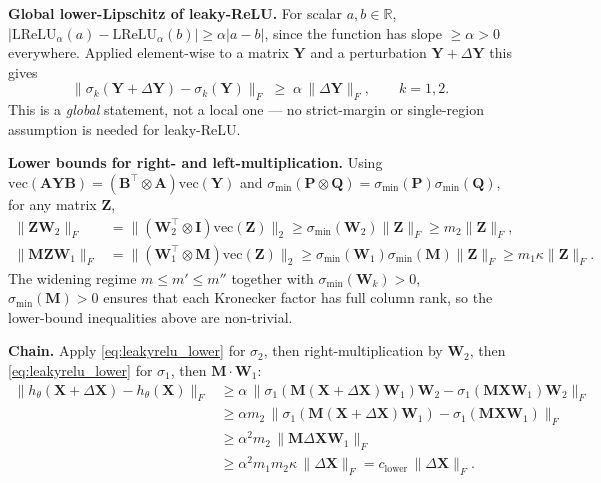 \textbf{Global lower-Lipschitz of leaky-ReLU.} For scalar $a,b\in\mathbb{R}$, $|\mathrm{LReLU}_\alpha(a)-\mathrm{LReLU}_\alpha(b)|\geq\alpha|a-b|$, since the function has slope $\geq\alpha>0$ everywhere. Applied element-wise to a matrix $\mathbf{Y}$ and a perturbation $\mathbf{Y}+\Delta\mathbf{Y}$ this gives
\begin{equation}
\|\sigma_k(\mathbf{Y}+\Delta\mathbf{Y})-\sigma_k(\mathbf{Y})\|_F\;\geq\;\alpha\,\|\Delta\mathbf{Y}\|_F,\qquad k=1,2.
\label{eq:leakyrelu_lower}
\end{equation}
This is a \emph{global} statement, not a local one — no strict-margin or single-region assumption is needed for leaky-ReLU.

\textbf{Lower bounds for right- and left-multiplication.} Using $\mathrm{vec}(\mathbf{A}\mathbf{Y}\mathbf{B})=(\mathbf{B}^\top\otimes\mathbf{A})\mathrm{vec}(\mathbf{Y})$ and $\sigma_{\min}(\mathbf{P}\otimes\mathbf{Q})=\sigma_{\min}(\mathbf{P})\sigma_{\min}(\mathbf{Q})$, for any matrix $\mathbf{Z}$,
\begin{align}
\|\mathbf{Z}\mathbf{W}_2\|_F&=\|(\mathbf{W}_2^\top\otimes\mathbf{I})\mathrm{vec}(\mathbf{Z})\|_2\geq\sigma_{\min}(\mathbf{W}_2)\|\mathbf{Z}\|_F\geq m_2\|\mathbf{Z}\|_F,\\
\|\mathbf{M}\mathbf{Z}\mathbf{W}_1\|_F&=\|(\mathbf{W}_1^\top\otimes\mathbf{M})\mathrm{vec}(\mathbf{Z})\|_2\geq\sigma_{\min}(\mathbf{W}_1)\sigma_{\min}(\mathbf{M})\|\mathbf{Z}\|_F\geq m_1\kappa\|\mathbf{Z}\|_F.
\end{align}
The widening regime $m\leq m'\leq m''$ together with $\sigma_{\min}(\mathbf{W}_k)>0$, $\sigma_{\min}(\mathbf{M})>0$ ensures that each Kronecker factor has full column rank, so the lower-bound inequalities above are non-trivial.

\textbf{Chain.} Apply \eqref{eq:leakyrelu_lower} for $\sigma_2$, then right-multiplication by $\mathbf{W}_2$, then \eqref{eq:leakyrelu_lower} for $\sigma_1$, then $\mathbf{M}\!\cdot\!\mathbf{W}_1$:
\begin{align}
\|h_\theta(\mathbf{X}\!+\!\Delta\mathbf{X})-h_\theta(\mathbf{X})\|_F
&\geq \alpha\,\|\sigma_1(\mathbf{M}(\mathbf{X}\!+\!\Delta\mathbf{X})\mathbf{W}_1)\mathbf{W}_2-\sigma_1(\mathbf{M}\mathbf{X}\mathbf{W}_1)\mathbf{W}_2\|_F\nonumber\\
&\geq \alpha m_2\,\|\sigma_1(\mathbf{M}(\mathbf{X}\!+\!\Delta\mathbf{X})\mathbf{W}_1)-\sigma_1(\mathbf{M}\mathbf{X}\mathbf{W}_1)\|_F\nonumber\\
&\geq \alpha^2 m_2\,\|\mathbf{M}\Delta\mathbf{X}\mathbf{W}_1\|_F\nonumber\\
&\geq \alpha^2 m_1 m_2 \kappa\,\|\Delta\mathbf{X}\|_F = c_{\text{lower}}\,\|\Delta\mathbf{X}\|_F.
\end{align}

